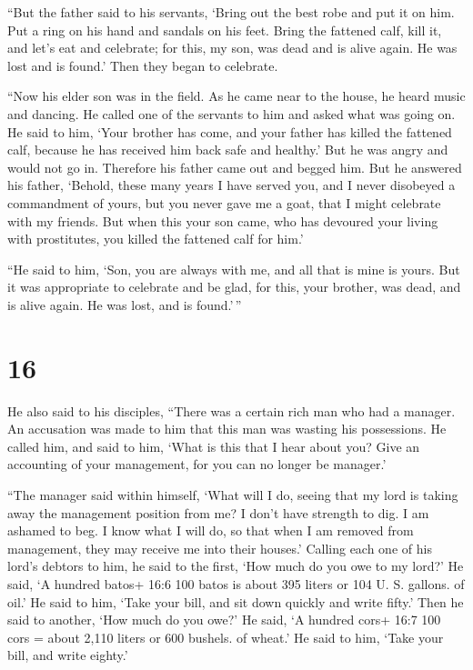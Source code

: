  ``But the father said to his servants, `Bring out the best
robe and put it on him. Put a ring on his hand and sandals on his feet.
 Bring the fattened calf, kill it, and let's eat and
celebrate;  for this, my son, was dead and is alive again.
He was lost and is found.' Then they began to celebrate.

 ``Now his elder son was in the field. As he came near to
the house, he heard music and dancing.  He called one of
the servants to him and asked what was going on.  He said
to him, `Your brother has come, and your father has killed the fattened
calf, because he has received him back safe and healthy.' 
But he was angry and would not go in. Therefore his father came out and
begged him.  But he answered his father, `Behold, these
many years I have served you, and I never disobeyed a commandment of
yours, but you never gave me a goat, that I might celebrate with my
friends.  But when this your son came, who has devoured
your living with prostitutes, you killed the fattened calf for him.'

 ``He said to him, `Son, you are always with me, and all
that is mine is yours.  But it was appropriate to celebrate
and be glad, for this, your brother, was dead, and is alive again. He
was lost, and is found.'\,''

\hypertarget{section-15}{%
\section{16}\label{section-15}}

 He also said to his disciples, ``There was a certain rich
man who had a manager. An accusation was made to him that this man was
wasting his possessions.  He called him, and said to him,
`What is this that I hear about you? Give an accounting of your
management, for you can no longer be manager.'

 ``The manager said within himself, `What will I do, seeing
that my lord is taking away the management position from me? I don't
have strength to dig. I am ashamed to beg.  I know what I
will do, so that when I am removed from management, they may receive me
into their houses.'  Calling each one of his lord's debtors
to him, he said to the first, `How much do you owe to my lord?'
 He said, `A hundred batos+ 16:6 100 batos is about 395
liters or 104 U. S. gallons. of oil.' He said to him, `Take your bill,
and sit down quickly and write fifty.'  Then he said to
another, `How much do you owe?' He said, `A hundred cors+ 16:7 100 cors
= about 2,110 liters or 600 bushels. of wheat.' He said to him, `Take
your bill, and write eighty.'

